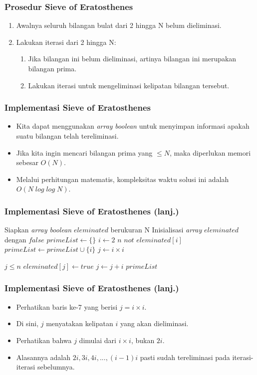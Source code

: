\begin{frame}
\frametitle{Prosedur Sieve of Eratosthenes}
\begin{enumerate}
  \item Awalnya seluruh bilangan bulat dari 2 hingga N belum dieliminasi.
  \item Lakukan iterasi dari 2 hingga N:
  \begin{enumerate}
    \item Jika bilangan ini belum dieliminasi, artinya bilangan ini merupakan bilangan prima.
    \item Lakukan iterasi untuk mengeliminasi kelipatan bilangan tersebut.  
  \end{enumerate}
\end{enumerate}
\end{frame}

\begin{frame}
\frametitle{Implementasi Sieve of Eratosthenes}
\begin{itemize}
  \item Kita dapat menggunakan \textit{array} \textit{boolean} untuk menyimpan informasi apakah suatu bilangan telah tereliminasi.
  \item Jika kita ingin mencari bilangan prima yang $\leq N$, maka diperlukan memori sebesar $O(N)$.
  \item Melalui perhitungan matematis, kompleksitas waktu solusi ini adalah $O(N\;log\;log\;N)$.
\end{itemize}
\end{frame}

\begin{frame}[fragile]
\frametitle{Implementasi Sieve of Eratosthenes (lanj.)}
\begin{codebox}
\li \Comment Siapkan \textit{array boolean} $eleminated$ berukuran N
\li \Comment Inisialisasi \textit{array} $eleminated$ dengan $false$
\li $primeList \gets \{\}$
\li \For $i \gets 2$ \To $n$
    \Do
\li   \If $not$ $eleminated[i]$
      \Then
\li     $primeList \gets primeList \cup \{i\}$
\li     $j \gets i \times i$ 

\li     \While $j \leq n$
        \Do
\li       $eleminated[j] \gets true$
\li       $j \gets j + i$       
        \End
      \End      
    \End
\li \Return $primeList$
\end{codebox}
\end{frame}

\begin{frame}
\frametitle{Implementasi Sieve of Eratosthenes (lanj.)}
\begin{itemize}
  \item Perhatikan baris ke-7 yang berisi $j = i \times i$.
  \item Di sini, $j$ menyatakan kelipatan $i$ yang akan dieliminasi.
  \item Perhatikan bahwa $j$ dimulai dari $i \times i$, bukan $2i$.
  \item Alasannya adalah $2i, 3i, 4i, ..., (i-1)i$ pasti sudah tereliminasi pada iterasi-iterasi sebelumnya.
\end{itemize}
\end{frame}

